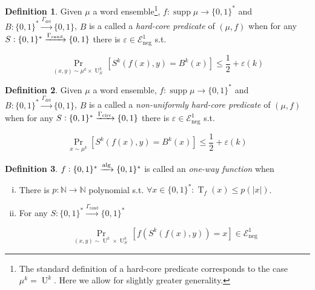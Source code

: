 \documentclass{article}
\numberwithin{equation}{section}
\theoremstyle{definition}
\newtheorem{definition}{Definition}[section]
\theoremstyle{plain}
\newcommand{\Bool}{\{0,1\}}
\newcommand{\Words}{{\Bool^*}}
\DeclareMathOperator{\Supp}{supp}
\DeclareMathOperator{\Prb}{Pr}
\DeclareMathOperator{\T}{T}
\DeclareMathOperator{\U}{U}
\newcommand{\Nats}{\mathbb{N}}
\newcommand{\Abs}[1]{\lvert #1 \rvert}
\newcommand{\Fall}{\mathcal{E}}
\newcommand{\Alg}{\xrightarrow{\textnormal{alg}}}
\begin{document}
\begin{samepage}
\begin{definition}

Given $\mu$ a word ensemble\footnote{The standard definition of a hard-core predicate corresponds to the case $\mu^k=\U^k$. Here we allow for slightly greater generality.}, $f: \Supp \mu \rightarrow \Words$ and ${B: \Words \xrightarrow{\Gamma_{\text{det}}} \Bool}$, $B$ is a called a \emph{hard-core predicate} of $(\mu,f)$ when for any $S: \Words \xrightarrow{\Gamma_{\textnormal{rand}}} \Bool$ there is $\varepsilon \in \Fall_{\text{neg}}^1$ s.t. 

\begin{equation}
\Prb_{(x,y) \sim \mu^k \times \U_S^k}[S^k(f(x),y)=B^k(x)] \leq \frac{1}{2} + \varepsilon(k)
\end{equation}

\end{definition}
\end{samepage}

\begin{samepage}
\begin{definition}

Given $\mu$ a word ensemble, $f: \Supp \mu \rightarrow \Words$ and ${B: \Words \xrightarrow{\Gamma_{\text{det}}} \Bool}$, $B$ is a called a \emph{non-uniformly hard-core predicate} of $(\mu,f)$ when for any ${S: \Words \xrightarrow{\Gamma_{\textnormal{circ}}} \Bool}$ there is $\varepsilon \in \Fall_{\text{neg}}^1$ s.t. 

\begin{equation}
\Prb_{x \sim \mu^k}[S^k(f(x),y)=B^k(x)] \leq \frac{1}{2} + \varepsilon(k)
\end{equation}

\end{definition}
\end{samepage}

\begin{samepage}
\begin{definition}

$f: \Words \Alg \Words$ is called an \emph{one-way function}
when

\begin{enumerate}[(i)]

\item There is $p: \Nats \rightarrow \Nats$ polynomial s.t. $\forall x \in \Words: \T_f(x) \leq p(\Abs{x})$.

\item For any $S: \Words \xrightarrow{\Gamma_{\text{rand}}} \Words$

\begin{equation}
\Prb_{(x,y) \sim \U^k \times \U_S^k}[f(S^k(f(x),y))=x] \in \Fall_{\text{neg}}^1
\end{equation}

\end{enumerate}

\end{definition}
\end{samepage}
\end{document}
